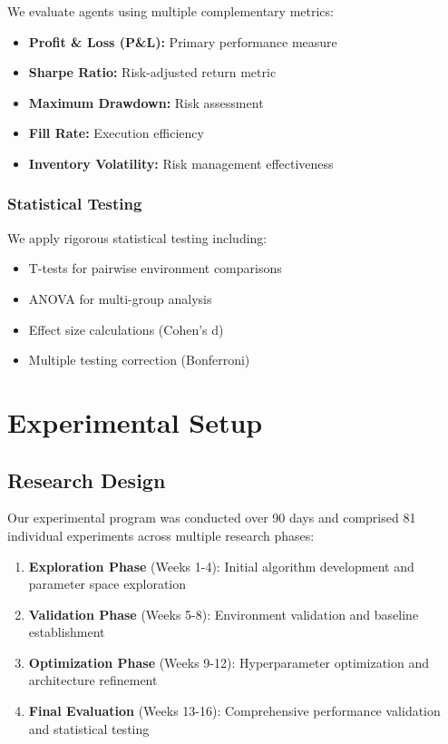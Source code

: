 \documentclass[conference]{IEEEtran}
\begin{document}
We evaluate agents using multiple complementary metrics:
\begin{itemize}
\item \textbf{Profit \& Loss (P\&L):} Primary performance measure
\item \textbf{Sharpe Ratio:} Risk-adjusted return metric
\item \textbf{Maximum Drawdown:} Risk assessment
\item \textbf{Fill Rate:} Execution efficiency
\item \textbf{Inventory Volatility:} Risk management effectiveness
\end{itemize}

\subsubsection{Statistical Testing}

We apply rigorous statistical testing including:
\begin{itemize}
\item T-tests for pairwise environment comparisons
\item ANOVA for multi-group analysis
\item Effect size calculations (Cohen's d)
\item Multiple testing correction (Bonferroni)
\end{itemize}



\section{Experimental Setup}

\subsection{Research Design}

Our experimental program was conducted over 90 days and comprised 81 individual experiments across multiple research phases:

\begin{enumerate}
\item \textbf{Exploration Phase} (Weeks 1-4): Initial algorithm development and parameter space exploration
\item \textbf{Validation Phase} (Weeks 5-8): Environment validation and baseline establishment  
\item \textbf{Optimization Phase} (Weeks 9-12): Hyperparameter optimization and architecture refinement
\item \textbf{Final Evaluation} (Weeks 13-16): Comprehensive performance validation and statistical testing
\end{enumerate}
\end{document}

